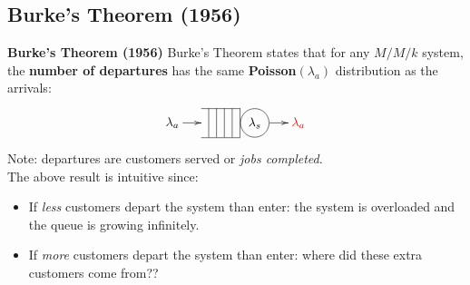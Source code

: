 \documentclass[compress]{beamer}        %
\makeatletter
\newcommand{\tcb}{\textcolor{beamer@blendedblue}}
\newcommand{\tcr}{\textcolor{red}}
\makeatother
\begin{document}
\subsection{Burke's Theorem (1956)}
\begin{frame}{\bf \tcb{Burke's Theorem (1956)}}
Burke's Theorem states that for any $M / M / k$ system, the {\bf number of departures} has the same {\bf Poisson{\boldmath$(\lambda_a)$}} distribution as the arrivals:
\begin{align*}
\xymatrixcolsep{0.5cm}
\xymatrix{\lambda_a \ar@{->}[r] & \hspace{-0.1cm}
{\begin{tabular}{@{}c|@{}c|@{}c|@{}c|@{}c|@{}c}
\cline{1-5}
&&&& &
\begin{tikzpicture}[baseline=(char.base)]
\node(char)[draw,shape=circle]{$\lambda_s$};
\end{tikzpicture}\\
\cline{1-5}
\end{tabular}} \hspace{-0.3cm}\ar@{->}[r] & \tcr{\lambda_a}
}
\end{align*}
Note: departures are customers served or \emph{jobs completed}.\\[0.4cm]

The above result is intuitive since:\\[0.1cm]
\begin{itemize}\itemsep0.3cm
\item If \emph{less} customers depart the system than enter: the system is overloaded and the queue is growing infinitely.
\item If \emph{more} customers depart the system than enter: where did these extra customers come from??
\end{itemize}


\end{frame}
\end{document}
